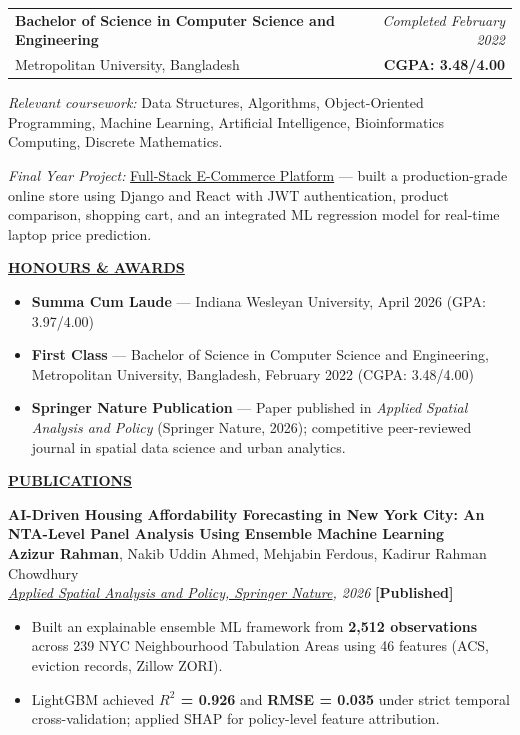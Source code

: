 \documentclass[10.5pt,letterpaper]{article}
\newcommand{\sectiontitle}[1]{\vspace{7pt}\noindent\underline{\textbf{#1}}\vspace{5pt}\par}
\newcommand{\pubentry}[4]{%
  \noindent\textbf{#1}\\[1pt]
  \noindent #2\\[1pt]
  \noindent\textit{#3} \hfill \textbf{[#4]}\\[4pt]
}
\begin{document}
\noindent
\begin{tabularx}{\linewidth}{@{}X r@{}}
  \textbf{Bachelor of Science in Computer Science and Engineering} & \textit{Completed February 2022} \\
  Metropolitan University, Bangladesh & \textbf{CGPA: 3.48/4.00}
\end{tabularx}

\vspace{3pt}
\textit{Relevant coursework:} Data Structures, Algorithms, Object-Oriented Programming, Machine Learning, Artificial Intelligence, Bioinformatics Computing, Discrete Mathematics.

\vspace{3pt}
\textit{Final Year Project:} \href{https://github.com/ayanchyaziz123/final-year-project-main}{Full-Stack E-Commerce Platform} --- built a production-grade online store using Django and React with JWT authentication, product comparison, shopping cart, and an integrated ML regression model for real-time laptop price prediction.

\sectiontitle{HONOURS \& AWARDS}
\begin{itemize}
  \item \textbf{Summa Cum Laude} --- Indiana Wesleyan University, April 2026 (GPA: 3.97/4.00)
  \item \textbf{First Class} --- Bachelor of Science in Computer Science and Engineering, Metropolitan University, Bangladesh, February 2022 (CGPA: 3.48/4.00)
  \item \textbf{Springer Nature Publication} --- Paper published in \textit{Applied Spatial Analysis and Policy} (Springer Nature, 2026); competitive peer-reviewed journal in spatial data science and urban analytics.
\end{itemize}

\sectiontitle{PUBLICATIONS}

\pubentry
  {AI-Driven Housing Affordability Forecasting in New York City: An NTA-Level Panel Analysis Using Ensemble Machine Learning}
  {\textbf{Azizur Rahman}, Nakib Uddin Ahmed, Mehjabin Ferdous, Kadirur Rahman Chowdhury}
  {\href{https://link.springer.com/article/10.1007/s12061-026-09955-4}{Applied Spatial Analysis and Policy, Springer Nature}, 2026}
  {Published}

\begin{itemize}
  \item Built an explainable ensemble ML framework from \textbf{2,512 observations} across 239 NYC Neighbourhood Tabulation Areas using 46 features (ACS, eviction records, Zillow ZORI).
  \item LightGBM achieved \textbf{$R^2$ = 0.926} and \textbf{RMSE = 0.035} under strict temporal cross-validation; applied SHAP for policy-level feature attribution.
\end{itemize}
\end{document}
